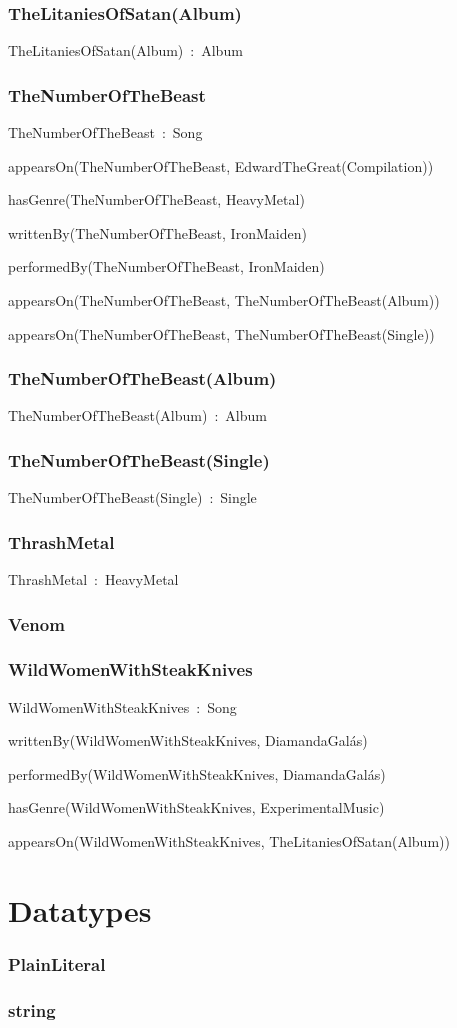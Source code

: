 \documentclass{article}
\begin{document}
\subsubsection*{TheLitaniesOfSatan(Album)}

TheLitaniesOfSatan(Album)~:~Album

\subsubsection*{TheNumberOfTheBeast}

TheNumberOfTheBeast~:~Song

appearsOn(TheNumberOfTheBeast, EdwardTheGreat(Compilation))

hasGenre(TheNumberOfTheBeast, HeavyMetal)

writtenBy(TheNumberOfTheBeast, IronMaiden)

performedBy(TheNumberOfTheBeast, IronMaiden)

appearsOn(TheNumberOfTheBeast, TheNumberOfTheBeast(Album))

appearsOn(TheNumberOfTheBeast, TheNumberOfTheBeast(Single))

\subsubsection*{TheNumberOfTheBeast(Album)}

TheNumberOfTheBeast(Album)~:~Album

\subsubsection*{TheNumberOfTheBeast(Single)}

TheNumberOfTheBeast(Single)~:~Single

\subsubsection*{ThrashMetal}

ThrashMetal~:~HeavyMetal

\subsubsection*{Venom}

\subsubsection*{WildWomenWithSteakKnives}

WildWomenWithSteakKnives~:~Song

writtenBy(WildWomenWithSteakKnives, DiamandaGalás)

performedBy(WildWomenWithSteakKnives, DiamandaGalás)

hasGenre(WildWomenWithSteakKnives, ExperimentalMusic)

appearsOn(WildWomenWithSteakKnives, TheLitaniesOfSatan(Album))

\section*{Datatypes}\subsubsection*{PlainLiteral}

\subsubsection*{string}
\end{document}

